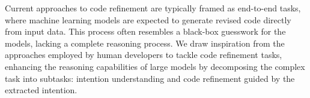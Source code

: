 Current approaches to code refinement are typically framed as end-to-end tasks, where machine learning models are expected to generate revised code directly from input data. This process often resembles a black-box guesswork for the models, lacking a complete reasoning process. 
We draw inspiration from the approaches employed by human developers to tackle code refinement tasks, enhancing the reasoning capabilities of large models by decomposing the complex task into subtasks: intention understanding and code refinement guided by the extracted intention.






